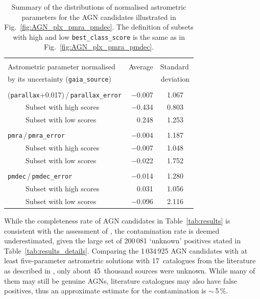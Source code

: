 \documentclass[longauth]{aa}
\begin{document}
\begin{table} 
\caption{Summary of the distributions of normalised astrometric parameters for the AGN candidates illustrated in Fig.~\ref{fig:AGN_plx_pmra_pmdec}. The definition of subsets with high and low \texttt{best\_class\_score} is the same as in Fig.~\ref{fig:AGN_plx_pmra_pmdec}. \label{tab:agn}} 
\centering    
\setlength{\tabcolsep}{4pt}
\begin{tabular}{lrc}   
\hline\hline & \\[-2.0ex]                 
Astrometric parameter normalised & Average & Standard\, \\
by its uncertainty (\texttt{gaia\_source})  &         & deviation \\
\hline & \\[-1.5ex]
(\texttt{parallax}+0.017)\,/\,\texttt{parallax\_error} & $-$0.007 & 1.067 \\
~~~~~Subset with high scores & $-$0.434 & 0.803\\
~~~~~Subset with low scores & 0.248 & 1.253\\
 & \\[-1.5ex]   
\texttt{pmra}\,/\,\texttt{pmra\_error} & $-$0.004 & 1.187 \\
~~~~~Subset with high scores & $-$0.007 & 1.048\\
~~~~~Subset with low scores & $-$0.022 & 1.752\\
 & \\[-1.5ex]  
\texttt{pmdec}\,/\,\texttt{pmdec\_error} & $-$0.014 & 1.280 \\
~~~~~Subset with high scores & 0.031 & 1.056\\
~~~~~Subset with low scores & $-$0.096 & 2.116\\
\hline    
\end{tabular}
\end{table}  

While the completeness rate of AGN candidates in Table~\ref{tab:results} is consistent with the assessment of \citet{DR3-DPACP-167}, the contamination rate is deemed underestimated, given the large set of 200\,081 `unknown' positives stated in Table~\ref{tab:results_details}. 
Comparing the 1\,034\,925 AGN candidates with at least five-parameter astrometric solutions with 17~catalogues from the literature as described in \citet{EDR3-DPACP-133}, only about 45~thousand sources were unknown. While many of them may still be genuine AGNs, literature catalogues may also have false positives, thus an approximate estimate for the contamination is $\sim$\,5\,\%.
\end{document}
